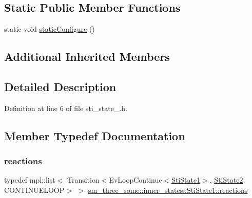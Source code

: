 \subsection*{Static Public Member Functions}
\begin{DoxyCompactItemize}
\item 
static void \hyperlink{structsm__three__some_1_1inner__states_1_1StiState1_a1caa7fccefcc671ace99ebecc534007f}{static\+Configure} ()
\end{DoxyCompactItemize}
\subsection*{Additional Inherited Members}


\subsection{Detailed Description}


Definition at line 6 of file sti\+\_\+state\+\_.\+h.



\subsection{Member Typedef Documentation}
\mbox{\label{structsm__three__some_1_1inner__states_1_1StiState1_a3880ea2992d3e5153deec7adafc52d8e}} 
\subsubsection{\texorpdfstring{reactions}{reactions}}
{\footnotesize\ttfamily typedef mpl\+::list$<$ Transition$<$Ev\+Loop\+Continue$<$\hyperlink{structsm__three__some_1_1inner__states_1_1StiState1}{Sti\+State1}$>$, \hyperlink{structsm__three__some_1_1inner__states_1_1StiState2}{Sti\+State2}, C\+O\+N\+T\+I\+N\+U\+E\+L\+O\+OP$>$ $>$ \hyperlink{structsm__three__some_1_1inner__states_1_1StiState1_a3880ea2992d3e5153deec7adafc52d8e}{sm\+\_\+three\+\_\+some\+::inner\+\_\+states\+::\+Sti\+State1\+::reactions}}



